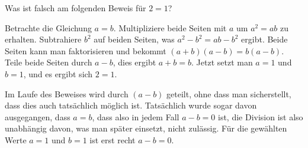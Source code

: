 Was ist falsch am folgenden Beweis für $2=1$?

Betrachte die Gleichung $a=b$. Multipliziere beide Seiten mit
$a$ um $a^2=ab$ zu erhalten. Subtrahiere $b^2$ auf beiden
Seiten, was $a^2-b^2=ab-b^2$ ergibt. Beide Seiten kann man
faktorisieren und bekommt $(a+b)(a-b)=b(a-b)$. Teile beide
Seiten durch $a-b$, dies ergibt $a+b=b$. Jetzt setzt man
$a=1$ und $b=1$, und es ergibt sich $2=1$.


\begin{loesung}
Im Laufe des Beweises wird durch $(a-b)$ geteilt, ohne dass man
sicherstellt, dass dies auch tatsächlich möglich ist.
Tatsächlich wurde sogar davon ausgegangen, dass $a=b$, dass
also in jedem Fall $a-b=0$ ist, die Division ist also unabhängig davon,
was man später einsetzt, nicht zulässig.
Für die
gewählten Werte $a=1$ und $b=1$  ist erst recht $a-b=0$.
\end{loesung}

